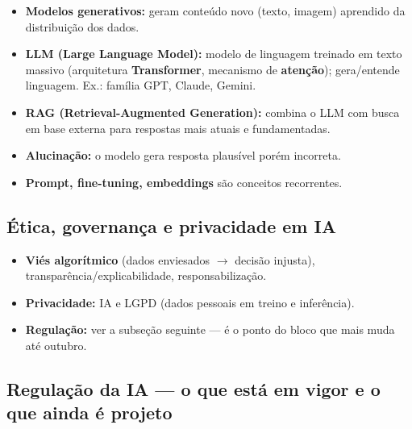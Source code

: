 \begin{itemize}
\item \textbf{Modelos generativos:} geram conteúdo novo (texto, imagem)
aprendido da distribuição dos dados.
\item \textbf{LLM (Large Language Model):} modelo de linguagem treinado em
texto massivo (arquitetura \textbf{Transformer}, mecanismo de
\textbf{atenção}); gera/entende linguagem. Ex.: família GPT, Claude, Gemini.
\item \textbf{RAG (Retrieval-Augmented Generation):} combina o LLM com
busca em base externa para respostas mais atuais e fundamentadas.
\item \textbf{Alucinação:} o modelo gera resposta plausível porém
incorreta.
\item \textbf{Prompt, fine-tuning, embeddings} são conceitos recorrentes.
\end{itemize}

\subsection{Ética, governança e privacidade em IA}

\begin{itemize}
\item \textbf{Viés algorítmico} (dados enviesados $\to$ decisão injusta),
transparência/explicabilidade, responsabilização.
\item \textbf{Privacidade:} IA e LGPD (dados pessoais em treino e
inferência).
\item \textbf{Regulação:} ver a subseção seguinte --- é o ponto do bloco que
mais muda até outubro.
\end{itemize}

\subsection{Regulação da IA --- o que está em vigor e o que ainda é projeto}

